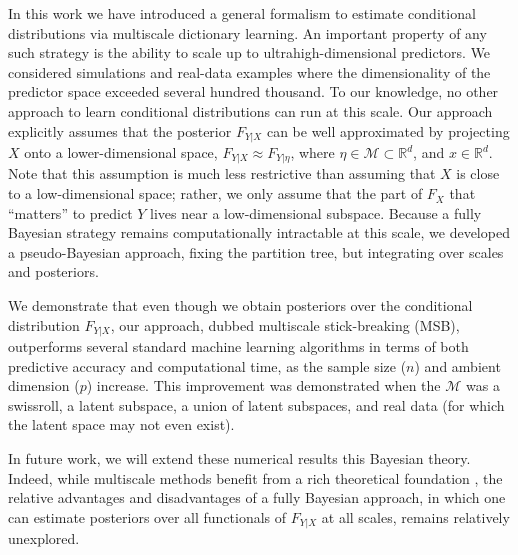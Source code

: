 \documentclass{article} %
\newcommand{\Real}{\mathbb{R}}
\providecommand{\mc}[1]{\mathcal{#1}}
\begin{document}
In this work we have introduced a general formalism to estimate conditional distributions via  multiscale dictionary learning.  An important property of any such strategy is the ability to scale up to ultrahigh-dimensional predictors.  We considered simulations and real-data examples where the dimensionality of the predictor space exceeded several hundred thousand.  To our knowledge, no other approach to learn conditional distributions can run at this scale.  Our approach explicitly assumes that the posterior $F_{Y|X}$ can be well approximated by projecting $X$ onto a lower-dimensional space, $F_{Y|X} \approx F_{Y|\eta}$, where $\eta \in \mc{M} \subset \Real^d$, and $x \in \Real^d$.   Note that this assumption is much less restrictive than assuming that $X$ is close to a low-dimensional space; rather, we only assume that the part of $F_X$ that ``matters'' to predict $Y$ lives near a low-dimensional subspace.  Because a fully Bayesian strategy remains computationally intractable at this scale, we developed a pseudo-Bayesian approach, fixing the partition tree, but integrating over scales and posteriors.

We demonstrate that even though we obtain posteriors over the conditional distribution $F_{Y|X}$, our approach, dubbed multiscale stick-breaking (MSB), outperforms several standard machine learning algorithms in terms of both predictive accuracy and computational time, as the sample size ($n$) and ambient dimension ($p$) increase.  This improvement was demonstrated when the $\mc{M}$ was a swissroll, a latent subspace, a union of latent subspaces, and real data (for which the latent space may not even exist).    

In future work, we will extend these numerical results this Bayesian theory.  Indeed, while multiscale methods benefit from a rich theoretical foundation \cite{Allard2012}, the relative advantages and disadvantages of a fully Bayesian approach, in which one can estimate posteriors over all functionals of $F_{Y|X}$ at all scales, remains relatively unexplored.  

 
 
\end{document}

